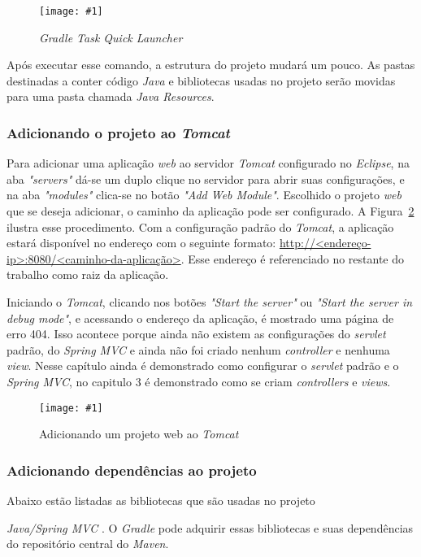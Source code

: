 \documentclass[a4paper,12pt]{article}
\newcommand{\spring} {
\est{Java/Spring MVC}
}
\newcommand{\figura}[3] {
	\begin{figure}[ht]
		\centering
		\texttt{[image: \#1]}
		\caption{#2}
		\label{#3}
	\end{figure}
	\FloatBarrier
}
\newcommand{\est}[1] {
\textit{#1}}
\newcommand{\lang}[1] {
\textit{#1}}
\begin{document}
\figura{gradlecommand.png}{\est{Gradle Task Quick Launcher}}{fig:13}

Após executar esse comando, a estrutura do projeto mudará um pouco. As pastas destinadas a conter código \lang{Java} e bibliotecas usadas no projeto serão movidas para uma pasta chamada \est{Java Resources}.

\subsubsection{Adicionando o projeto ao \est{Tomcat}}

Para adicionar uma aplicação \est{web} ao servidor \est{Tomcat} configurado no \est{Eclipse}, na aba \est{"servers"} dá-se um duplo clique no servidor para abrir suas configurações, e na aba \est{"modules"} clica-se no botão \est{"Add Web Module"}. Escolhido o projeto \est{web} que se deseja adicionar, o caminho da aplicação pode ser configurado. A Figura~\ref{fig:14} ilustra esse procedimento. Com a configuração padrão do \est{Tomcat}, a aplicação estará disponível no endereço com o seguinte formato: \url{http://<endereço-ip>:8080/<caminho-da-aplicação>}. Esse endereço é referenciado no restante do trabalho como raiz da aplicação.

Iniciando o \est{Tomcat}, clicando nos botões \est{"Start the server"} ou \est{"Start the server in debug mode"}, e acessando o endereço da aplicação, é mostrado uma página de erro 404. Isso acontece porque ainda não existem as configurações do \est{servlet} padrão, do \est{Spring MVC} e ainda não foi criado nenhum \est{controller} e nenhuma \est{view}. Nesse capítulo ainda é demonstrado como configurar o \est{servlet} padrão e o \est{Spring MVC}, no capitulo 3 é demonstrado como se criam \est{controllers} e \est{views}.

\figura{tomcatproject.png}{Adicionando um projeto web ao \est{Tomcat}}{fig:14}

\subsubsection{Adicionando dependências ao projeto}

Abaixo estão listadas as bibliotecas que são usadas no projeto \spring. O \est{Gradle} pode adquirir essas bibliotecas e suas dependências do repositório central do \est{Maven}.
\end{document}
